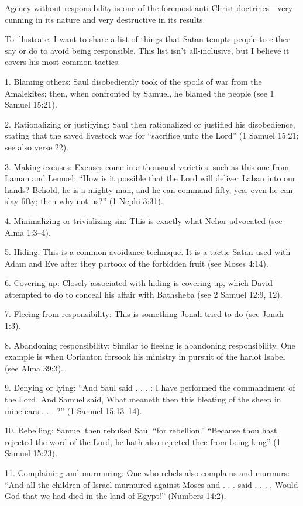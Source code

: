 \documentclass[letterpaper, 11pt]{report}
\newcommand{\intalkheader}[1]{
    \vspace{0.75em}
    \noindent{\normalsize\bfseries #1}
    \par\nopagebreak %
    \vspace{0.25em}
    \nopagebreak     %
}
\begin{document}
Agency without responsibility is one of the foremost anti-Christ doctrines—very cunning in its nature and very destructive in its results.

\intalkheader{The Anti-Responsibility List}
To illustrate, I want to share a list of things that Satan tempts people to either say or do to avoid being responsible. This list isn’t all-inclusive, but I believe it covers his most common tactics.

1. Blaming others: Saul disobediently took of the spoils of war from the Amalekites; then, when confronted by Samuel, he blamed the people (see 1 Samuel 15:21).

2. Rationalizing or justifying: Saul then rationalized or justified his disobedience, stating that the saved livestock was for “sacrifice unto the Lord” (1 Samuel 15:21; see also verse 22).

3. Making excuses: Excuses come in a thousand varieties, such as this one from Laman and Lemuel: “How is it possible that the Lord will deliver Laban into our hands? Behold, he is a mighty man, and he can command fifty, yea, even he can slay fifty; then why not us?” (1 Nephi 3:31).

4. Minimalizing or trivializing sin: This is exactly what Nehor advocated (see Alma 1:3–4).

5. Hiding: This is a common avoidance technique. It is a tactic Satan used with Adam and Eve after they partook of the forbidden fruit (see Moses 4:14).

6. Covering up: Closely associated with hiding is covering up, which David attempted to do to conceal his affair with Bathsheba (see 2 Samuel 12:9, 12).

7. Fleeing from responsibility: This is something Jonah tried to do (see Jonah 1:3).

8. Abandoning responsibility: Similar to fleeing is abandoning responsibility. One example is when Corianton forsook his ministry in pursuit of the harlot Isabel (see Alma 39:3).

9. Denying or lying: “And Saul said . . . : I have performed the commandment of the Lord. And Samuel said, What meaneth then this bleating of the sheep in mine ears . . . ?” (1 Samuel 15:13–14).

10. Rebelling: Samuel then rebuked Saul “for rebellion.” “Because thou hast rejected the word of the Lord, he hath also rejected thee from being king” (1 Samuel 15:23).

11. Complaining and murmuring: One who rebels also complains and murmurs: “And all the children of Israel murmured against Moses and . . . said . . . , Would God that we had died in the land of Egypt!” (Numbers 14:2).
\end{document}
